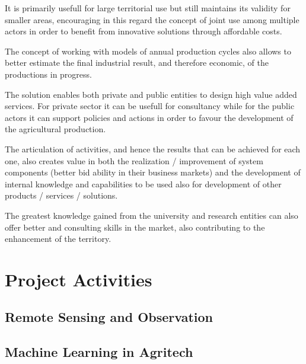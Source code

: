 \documentclass[a4paper, comsoc]{IEEEtran}
\begin{document}
It is primarily usefull for large territorial use but still maintains its validity for smaller areas, encouraging in this regard the concept of joint use among multiple actors in order to benefit from innovative solutions through affordable costs.


The concept of working with models of annual production cycles also allows to better estimate the final industrial result, and therefore economic, of the productions in progress.


The solution enables both private and public entities to design high value added services. For private sector it can be usefull for consultancy while for the public actors it can support policies and actions in order to favour the development of the agricultural production.


The articulation of activities, and hence the results that can be achieved for each one, also creates value in both the realization / improvement of system components (better bid ability in their business markets) and the development of internal knowledge and capabilities to be used also for development of other products / services / solutions.


The greatest knowledge gained from the university and research entities can also offer better and consulting skills in the market, also contributing to the enhancement of the territory.

\lipsum[2-3]

\section{Project Activities}\label{sec:activities}

\subsection{Remote Sensing and Observation}

\lipsum[2-10] %

\subsection{Machine Learning in Agritech}
\end{document}
